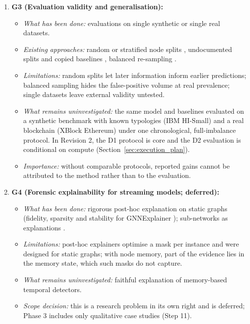 \documentclass[11pt,a4paper]{article}
\begin{document}
\begin{enumerate}[leftmargin=*]
    \item \textbf{G3 (Evaluation validity and generalisation):}
    \begin{itemize}[leftmargin=*]
        \item \textit{What has been done:} evaluations on single synthetic or single real datasets.
        \item \textit{Existing approaches:} random or stratified node splits \cite{kasula2025ajk,jia2025lmae4eth,alemari2026explainable,lin2026chronowave}, undocumented splits and copied baselines \cite{ferretti2025aml,li2025tfgat}, balanced re-sampling \cite{tian2025kar,rico2026taml}.
        \item \textit{Limitations:} random splits let later information inform earlier predictions; balanced sampling hides the false-positive volume at real prevalence; single datasets leave external validity untested.
        \item \textit{What remains uninvestigated:} the same model and baselines evaluated on a synthetic benchmark with known typologies (IBM HI-Small) and a real blockchain (XBlock Ethereum) under one chronological, full-imbalance protocol. In Revision 2, the D1 protocol is core and the D2 evaluation is conditional on compute (Section~\ref{sec:execution_plan}).
        \item \textit{Importance:} without comparable protocols, reported gains cannot be attributed to the method rather than to the evaluation.
    \end{itemize}

    \item \textbf{G4 (Forensic explainability for streaming models; deferred):}
    \begin{itemize}[leftmargin=*]
        \item \textit{What has been done:} rigorous post-hoc explanation on static graphs (fidelity, sparsity and stability for GNNExplainer \cite{alemari2026explainable,ying2019gnnexplainer}); sub-networks as explanations \cite{rico2026taml}.
        \item \textit{Limitations:} post-hoc explainers optimise a mask per instance and were designed for static graphs; with node memory, part of the evidence lies in the memory state, which such masks do not capture.
        \item \textit{What remains uninvestigated:} faithful explanation of memory-based temporal detectors.
        \item \textit{Scope decision:} this is a research problem in its own right and is deferred; Phase 3 includes only qualitative case studies (Step 11).
    \end{itemize}
\end{enumerate}
\end{document}
